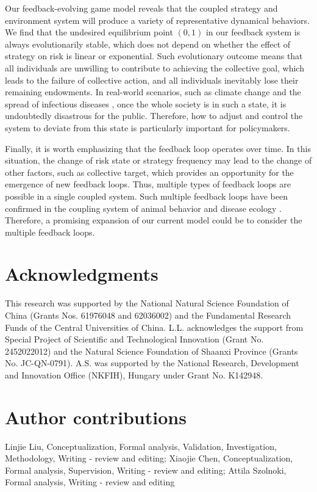 \documentclass[9pt]{elife}
\begin{document}
Our feedback-evolving game model reveals that the coupled strategy and environment system will produce a variety of representative dynamical behaviors. We find that the undesired equilibrium point $(0, 1)$ in our feedback system is always evolutionarily stable, which does not depend on whether the effect of strategy on risk is linear or exponential. Such evolutionary outcome means that all individuals are unwilling to contribute to achieving the collective goal, which leads to the failure of collective action, and all individuals inevitably lose their remaining endowments. In real-world scenarios, such as climate change \citep{milinski2008collective} and the spread of infectious diseases \citep{cronk2021design,chen2022highly}, once the whole society is in such a state, it is undoubtedly disastrous for the public. Therefore, how to adjust and control the system to deviate from this state is particularly important for policymakers.

Finally, it is worth emphasizing that the feedback loop operates over time. In this situation, the change of risk state or strategy frequency may lead to the change of other factors, such as collective target, which provides an opportunity for the emergence of new feedback loops. Thus, multiple types of feedback loops are possible in a single coupled system. Such multiple feedback loops have been confirmed in the coupling system of animal behavior and disease ecology \citep{ezenwa2016host}. Therefore, a promising expansion of our current model could be to consider the multiple feedback loops.


\section{Acknowledgments}

This research was supported by the National Natural Science Foundation of China (Grants Nos. 61976048 and 62036002) and the Fundamental Research Funds of the Central Universities of China. L.L. acknowledges the support from Special Project of Scientific and Technological Innovation (Grant No. 2452022012) and the Natural Science Foundation of Shaanxi Province (Grants No. JC-QN-0791). A.S. was supported by the National Research, Development and Innovation
Office (NKFIH), Hungary under Grant No. K142948.

\section{Author contributions}
Linjie Liu, Conceptualization, Formal analysis, Validation, Investigation, Methodology, Writing - review and editing; 
Xiaojie Chen, Conceptualization, Formal analysis, Supervision, Writing - review and editing; 
Attila Szolnoki, Formal analysis, Writing - review and editing
\end{document}
